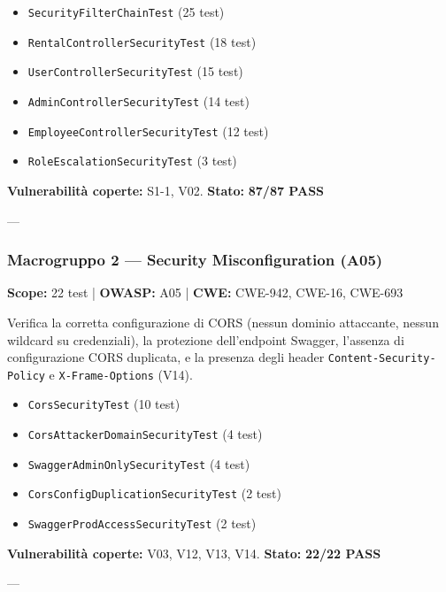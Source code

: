 \documentclass[12pt, a4paper]{article}
\begin{document}
    \begin{itemize}
        \item \texttt{SecurityFilterChainTest} (25 test)
        \item \texttt{RentalControllerSecurityTest} (18 test)
        \item \texttt{UserControllerSecurityTest} (15 test)
        \item \texttt{AdminControllerSecurityTest} (14 test)
        \item \texttt{EmployeeControllerSecurityTest} (12 test)
        \item \texttt{RoleEscalationSecurityTest} (3 test)
    \end{itemize}

    \textbf{Vulnerabilità coperte:} S1-1, V02. \quad
    \textbf{Stato:} \checkmark{} \textbf{87/87 PASS}

    ---

    \subsubsection{Macrogruppo 2 — Security Misconfiguration (A05)}
    \label{subsubsec:group2_misconfiguration}

    \textbf{Scope:} 22 test | \textbf{OWASP:} A05 | \textbf{CWE:} CWE-942, CWE-16, CWE-693

    Verifica la corretta configurazione di CORS (nessun dominio attaccante, nessun
    wildcard su credenziali), la protezione dell'endpoint Swagger, l'assenza di
    configurazione CORS duplicata, e la presenza degli header
    \texttt{Content-Security-Policy} e \texttt{X-Frame-Options} (V14).

    \begin{itemize}
        \item \texttt{CorsSecurityTest} (10 test)
        \item \texttt{CorsAttackerDomainSecurityTest} (4 test)
        \item \texttt{SwaggerAdminOnlySecurityTest} (4 test)
        \item \texttt{CorsConfigDuplicationSecurityTest} (2 test)
        \item \texttt{SwaggerProdAccessSecurityTest} (2 test)
    \end{itemize}

    \textbf{Vulnerabilità coperte:} V03, V12, V13, V14. \quad
    \textbf{Stato:} \checkmark{} \textbf{22/22 PASS}

    ---
\end{document}
